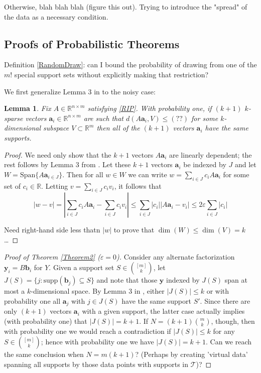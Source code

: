 \documentclass[journal, onecolumn]{IEEEtran}
\newtheorem{lemma}{Lemma}
\begin{document}
Otherwise, blah blah blah (figure this out). Trying to introduce the "spread" of the data as a necessary condition.


\subsection{Proofs of Probabilistic Theorems}\label{PUTproof}

Definition \ref{RandomDraw}: can I bound the probability of drawing from one of the $m!$ special support sets without explicitly making that restriction?

We first generalize Lemma 3 in \cite{Hillar15} to the noisy case:

\begin{lemma}
Fix $A \in \mathbb{R}^{n \times m}$ satisfying \eqref{RIP}. With probability one, if $(k+1)$ $k$-sparse vectors $\mathbf{a}_i \in \mathbb{R}^{n \times m}$ are such that $d(A\mathbf{a}_i,V) \leq (??)$ for some $k$-dimensional subspace $V \subset \mathbb{R}^m$ then all of the $(k+1)$ vectors $\mathbf{a}_i$ have the same supports.
\end{lemma}
\begin{proof}
We need only show that the $k+1$ vectors $A\mathbf{a}_i$ are linearly dependent; the rest follows by Lemma 3 from \cite{Hillar15}. Let these $k+1$ vectors $\mathbf{a}_i$ be indexed by $J$ and let $W = \text{Span}\{A\mathbf{a}_{i \in J}\}$. Then for all $w \in W$ we can write $w = \sum_{i \in J} c_iA\mathbf{a}_i$ for some set of $c_i \in \mathbb{R}$. Letting $v = \sum_{i \in J} c_iv_i$, it follows that
\[ |w - v| = |\sum_{i \in J} c_i A\mathbf{a}_i - \sum_{i \in J} c_i v_i | 
\leq \sum_{i \in J} |c_i| |A\mathbf{a}_i - v_i| \leq 2\varepsilon \sum_{i \in J}|c_i| \]

Need right-hand side less thatn $|w|$ to prove that $\dim(W) \leq \dim(V) = k$\ldots
\end{proof}

\begin{proof}[Proof of Theorem \ref{Theorem2} ($\varepsilon = 0$)]
Consider any alternate factorization $\mathbf{y}_i = B\mathbf{b}_i$ for $Y$. Given a support set $S \in {[m]\choose k}$, let $J(S) = \{j: \text{supp}(\mathbf{b}_j) \subseteq S\}$ and note that those $\mathbf{y}$ indexed by $J(S)$ span at most a $k$-dimensional space. By Lemma 3 in \cite{Hillar15}, either $|J(S)| \leq k$ or with probability one all $\mathbf{a}_j$ with $j \in J(S)$ have the same support $S'$. Since there are only $(k+1)$ vectors $\mathbf{a}_i$ with a given support, the latter case actually implies (with probability one) that $|J(S)| = k+1$. If $N=(k+1){m \choose k}$, though, then with probability one we would reach a contradiction if $|J(S)| \leq k$ for any $S \in {[m] \choose k}$; hence with probability one we have $|J(S)| = k+1$. Can we reach the same conclusion when $N = m(k+1)$? (Perhaps by creating 'virtual data' spanning all supports by those data points with supports in $\mathcal{T}$)?

\end{proof}
\end{document}
